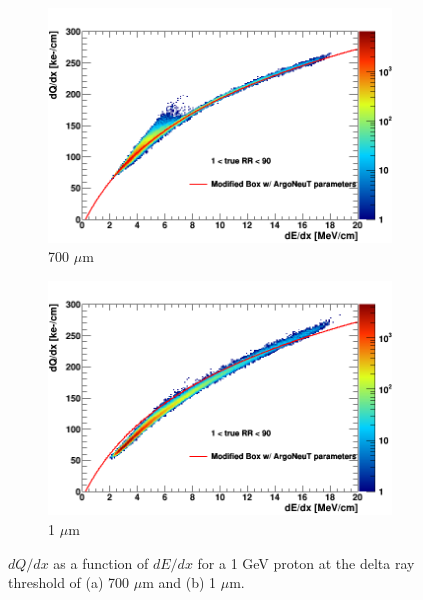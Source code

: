 \begin{figure}[hb!]
        \centering
        \begin{subfigure}[b]{0.495\textwidth}
            \centering
            \includegraphics[width=\textwidth]{proton_700um}
            \caption{700 $\mu$m}%
            \label{fig:proton_2d_700}
        \end{subfigure}
        \hfill
        \begin{subfigure}[b]{0.495\textwidth}  
            \centering 
            \includegraphics[width=\textwidth]{proton_1um}
            \caption{1 $\mu$m}%
            \label{fig:proton_2d_1}
        \end{subfigure}
	\caption[Charge to Energy Loss Conversion of a 1 GeV Proton]{$dQ/dx$ as a function of $dE/dx$ for a 1 GeV proton at the delta ray threshold of (a) 700 $\mu$m and (b) 1 $\mu$m.}
        \label{fig:proton_2d}

\end{figure}
